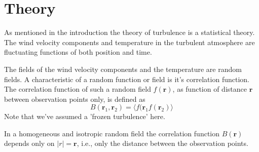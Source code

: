 \section{Theory}
As mentioned in the introduction the theory of turbulence is a statistical theory.
The wind velocity components and temperature in the turbulent atmosphere are fluctuating functions of both position and time.

The fields of the wind velocity components and the temperature are random fields.
A characteristic of a random function or field is it's correlation function. \cite{Tatarskii1971}
The correlation function of such a random field $f(\mathbf{r})$, as function of distance $\mathbf{r}$ between observation points only, is defined as
\begin{equation}
 B(\mathbf{r}_1, \mathbf{r}_2) = \langle f(\mathbf{r}_1  f(\mathbf{r}_2) \rangle
\end{equation}
Note that we've assumed a 'frozen turbulence' here. 

In a homogeneous and isotropic random field the correlation function $B(\mathbf{r})$ 
depends only on $|r|=\mathbf{r}$, i.e., only the distance between the observation points.


